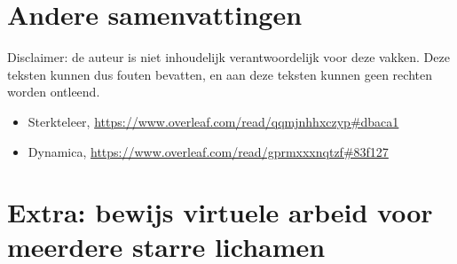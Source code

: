 \documentclass{article}
\begin{document}
\section*{Andere samenvattingen}
Disclaimer: de auteur is niet inhoudelijk verantwoordelijk voor deze vakken. Deze teksten kunnen dus fouten bevatten, en aan deze teksten kunnen geen rechten worden ontleend.

\begin{itemize}
    \item Sterkteleer, \url{https://www.overleaf.com/read/qqmjnhhxczyp#dbaca1}
    \item Dynamica, \url{https://www.overleaf.com/read/gprmxxxnqtzf#83f127}
\end{itemize}

\newpage

\section*{Extra: bewijs virtuele arbeid voor meerdere starre lichamen}
\end{document}
